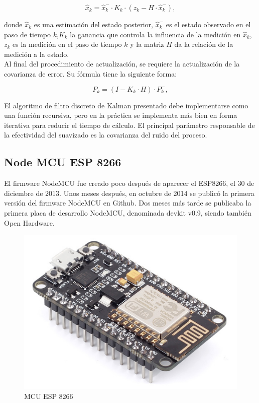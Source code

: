 \documentclass[10pt,a4paper]{article}
\begin{document}
\begin{multicols}{2}
\begin{itemize}
\begin{equation}
\hat{x}_{k} =\hat{x}_{k}^- \cdot K_{k} \cdot (z_{k}-H \cdot \hat{x}_{k}^-),
\end{equation}

donde $\hat{x}_{k}$ es una estimación del estado posterior, $\hat{x}_{k}^-$ es el estado observado en el paso de tiempo $k$,$K_{k}$ la ganancia que controla la influencia de la medición en $\hat{x}_{k}$, $z_{k}$ es la medición en el paso de tiempo $k$ y la matriz $H$ da la relación de la medición a la estado.\\
Al final del procedimiento de actualización, se requiere la actualización de la covarianza de error. Su fórmula tiene la siguiente forma:

\begin{equation}
 P_{k}=(I-K_{k} \cdot H)\cdot P_{k}^-,
\end{equation}

El algoritmo de filtro discreto de Kalman presentado debe implementarse como una función recursiva, pero en la práctica se implementa más bien en forma iterativa para reducir el tiempo de cálculo. El principal parámetro responsable de la efectividad del suavizado es la covarianza del ruido del proceso.

\subsection{Node MCU ESP 8266}
El firmware NodeMCU fue creado poco después de aparecer el ESP8266, el 30 de diciembre de 2013. Unos meses después, en octubre de 2014 se publicó la primera versión del firmware NodeMCU en Github. Dos meses más tarde se publicaba la primera placa de desarrollo NodeMCU, denominada devkit v0.9, siendo también Open Hardware.

\begin{figure}[H]
\centering
\includegraphics[scale=0.5]{mcu.PNG}
\caption{MCU ESP 8266}
\end{figure}



\end{itemize}
\end{multicols}
\end{document}
